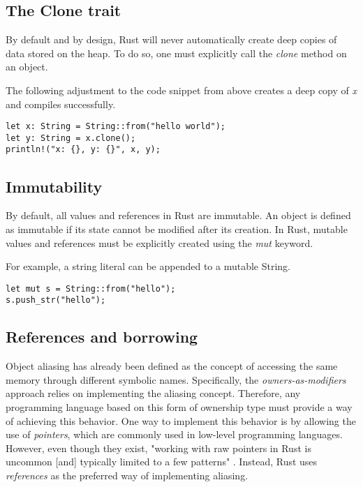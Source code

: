 \documentclass[sigplan,11pt,nonacm]{acmart}
\begin{document}
\subsection{The Clone trait}
\label{sec:rust-clone-trait}

By default and by design, Rust will never automatically create deep copies of data stored on the heap.
To do so, one must explicitly call the \emph{clone} method on an object.

The following adjustment to the code snippet from above creates a deep copy of \emph{x} and compiles successfully.
\begin{lstlisting}
let x: String = String::from("hello world");
let y: String = x.clone();
println!("x: {}, y: {}", x, y);
\end{lstlisting}


\subsection{Immutability}
\label{sec:rust-immutability}

By default, all values and references in Rust are immutable.
An object is defined as immutable if its state cannot be modified after its creation.
In Rust, mutable values and references must be explicitly created using the \emph{mut} keyword.

For example, a string literal can be appended to a mutable String.
\begin{lstlisting}
let mut s = String::from("hello");
s.push_str("hello");
\end{lstlisting}


\subsection{References and borrowing}
\label{sec:rust-references}

Object aliasing has already been defined as the concept of accessing the same memory through different symbolic names.
Specifically, the \emph{owners-as-modifiers} approach relies on implementing the aliasing concept.
Therefore, any programming language based on this form of ownership type must provide a way of achieving this behavior.
One way to implement this behavior is by allowing the use of \emph{pointers}, which are commonly used in low-level programming languages.
However, even though they exist, "working with raw pointers in Rust is uncommon [and] typically limited to a few patterns" \cite{rust-pointer-documentation}.
Instead, Rust uses \emph{references} as the preferred way of implementing aliasing.
\end{document}

